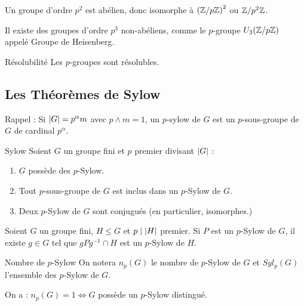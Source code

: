\documentclass{cours}
\begin{document}
\begin{corollaire}{}{}
    Un groupe d'ordre $p^{2}$ est abélien, donc isomorphe à $\left(\mathbb{Z}/p\mathbb{Z}\right)^{2}$ ou $\mathbb{Z}/p^{2}\mathbb{Z}$.
\end{corollaire}

\begin{remark}
    Il existe des groupes d'ordre $p^{3}$ non-abéliens, comme le $p$-groupe $U_{3}(\mathbb{Z}/p\mathbb{Z})$ appelé Groupe de Heisenberg.
\end{remark}

\begin{corollaire}{Résolubilité}{}
    Les $p$-groupes sont résolubles.
\end{corollaire}

\subsection{Les Théorèmes de Sylow}
Rappel : Si $\left|G\right| = p^{\alpha}m$ avec $p \wedge m = 1$, un $p$-sylow de $G$ est un $p$-sous-groupe de $G$ de cardinal $p^{\alpha}$.

\begin{théorème}{Sylow}{}
    Soient $G$ un groupe fini et $p$ premier divisant $\left|G\right|$ :
    \begin{enumerate}
        \item $G$ possède des $p$-Sylow.
        \item Tout $p$-sous-groupe de $G$ est inclus dans un $p$-Sylow de $G$.
        \item Deux $p$-Sylow de $G$ sont conjugués (en particulier, isomorphes.)
    \end{enumerate}
\end{théorème}

\begin{lemma}
    Soient $G$ un groupe fini, $H \leq G$ et $p \mid \left|H\right|$ premier. Si $P$ est un $p$-Sylow de $G$, il existe $g \in G$ tel que $gPg^{-1} \cap H$ est un $p$-Sylow de $H$.
\end{lemma}

\begin{définition}{Nombre de $p$-Sylow}{}
    On notera $n_{p}(G)$ le nombre de $p$-Sylow de $G$ et $Syl_{p}(G)$ l'ensemble des $p$-Sylow de $G$.
\end{définition}
\begin{corollaire}{}{}
    On a : $n_{p}(G) = 1 \Leftrightarrow G$ possède un $p$-Sylow distingué.
\end{corollaire}
\end{document}
